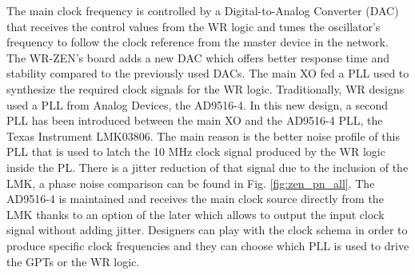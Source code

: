 The main clock frequency is controlled by a Digital-to-Analog Converter (DAC) that receives the control values from the WR logic and tunes the oscillator's frequency to follow the clock reference from the master device in the network. The WR-ZEN's board adds a new DAC which offers better response time and stability compared to the previously used DACs. The main XO fed a PLL used to synthesize the required clock signals for the WR logic. Traditionally, WR designs used a PLL from Analog Devices, the AD9516-4. In this new design, a second PLL has been introduced between the main XO and the AD9516-4 PLL, the Texas Instrument LMK03806. The main reason is the better noise profile of this PLL that is used to latch the 10 MHz clock signal produced by the WR logic inside the PL. There is a jitter reduction of that signal due to the inclusion of the LMK, a phase noise comparison can be found in Fig. \ref{fig:zen_pn_all}. The AD9516-4 is maintained and receives the main clock source directly from the LMK thanks to an option of the later which allows to output the input clock signal without adding jitter. Designers can play with the clock schema in order to produce specific clock frequencies and they can choose which PLL is used to drive the GPTs or the WR logic.



